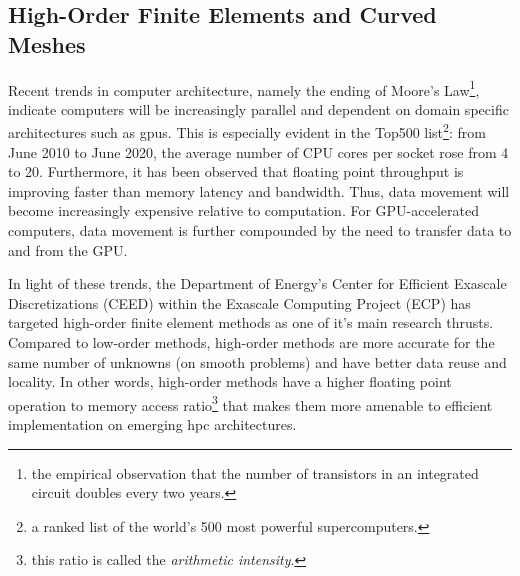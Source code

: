 \documentclass[../doc.tex]{subfiles}
\begin{document}
\subsection{High-Order Finite Elements and Curved Meshes}
Recent trends in computer architecture, namely the ending of Moore's Law\footnote{the empirical observation that the number of transistors in an integrated circuit doubles every two years.}, indicate computers will be increasingly parallel and dependent on domain specific architectures such as \glspl{gpu}. This is especially evident in the Top500 list\footnote{a ranked list of the world's 500 most powerful supercomputers.}: from June 2010 to June 2020, the average number of CPU cores per socket rose from 4 to 20. 
Furthermore, it has been observed that floating point throughput is improving faster than memory latency and bandwidth. Thus, data movement will become increasingly expensive relative to computation. For GPU-accelerated computers, data movement is further compounded by the need to transfer data to and from the GPU. 

In light of these trends, the Department of Energy's Center for Efficient Exascale Discretizations (CEED) within the Exascale Computing Project (ECP) has targeted high-order finite element methods as one of it's main research thrusts. Compared to low-order methods, high-order methods are more accurate for the same number of unknowns (on smooth problems) and have better data reuse and locality. In other words, high-order methods have a higher floating point operation to memory access ratio\footnote{this ratio is called the \emph{arithmetic intensity}.} that makes them more amenable to efficient implementation on emerging \gls{hpc} architectures. 
\end{document}
